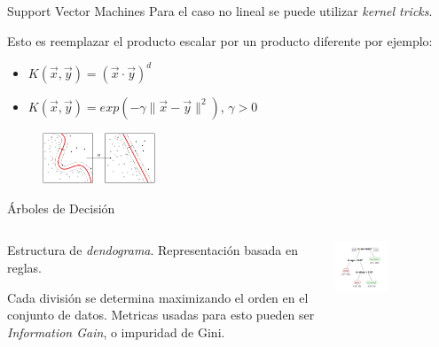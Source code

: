 \documentclass[11pt]{beamer}
\begin{document}
\begin{frame}{Support Vector Machines}
Para el caso no lineal se puede utilizar \textit{kernel tricks}.

Esto es reemplazar el producto escalar por un producto diferente por ejemplo:
\begin{itemize}
    \item $K(\vec{x}, \vec{y}) = (\vec{x} \cdot \vec{y})^d$
    \item $K(\vec{x}, \vec{y}) = exp(-\gamma \|\vec{x} - \vec{y}\|^2)$, $\gamma>0$
\end{itemize}
\begin{figure}
    \centering
    \includegraphics[width=0.3\textwidth]{images/Kernel_MachineSVM.png}
\end{figure}
\end{frame}
\begin{frame}{\'Arboles de Decisi\'on}
    \begin{columns}
    \begin{column}{0.5\textwidth}
    Estructura de \textit{dendograma}.
    Representaci\'on basada en reglas.
    
    Cada divisi\'on se determina maximizando el orden en el conjunto de datos.
    Metricas usadas para esto pueden ser \textit{Information Gain}, o impuridad de Gini.
    \end{column}
    
    \begin{column}{0.5\textwidth}
    \begin{center}
    \includegraphics[width=0.45\textwidth]{images/CART_tree_titanic_survivors.png}
    \end{center}
    \end{column}
    
    \end{columns}
\end{frame}
\end{document}
